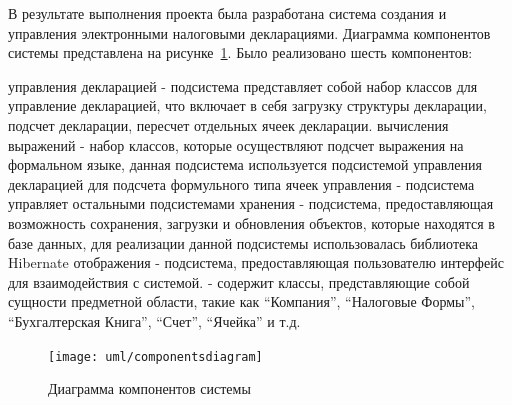 \documentclass[14pt,a4paper]{reportmod}
\begin{document}
В результате выполнения проекта была разработана система создания и управления электронными налоговыми декларациями. Диаграмма компонентов системы представлена на рисунке~\ref{pic:componentsdiagram}. Было реализовано шесть компонентов:
\begin{itemize}
   управления декларацией - подсистема представляет собой набор классов для управление декларацией, что включает в себя загрузку структуры декларации, подсчет декларации, пересчет отдельных ячеек декларации.
   вычисления выражений - набор классов, которые осуществляют подсчет выражения на формальном языке, данная подсистема используется подсистемой управления декларацией для подсчета формульного типа ячеек
   управления - подсистема управляет остальными подсистемами
   хранения - подсистема, предоставляющая возможность сохранения, загрузки и обновления объектов, которые находятся в базе данных, для реализации данной подсистемы использовалась библиотека Hibernate
   отображения - подсистема, предоставляющая пользователю интерфейс для взаимодействия с системой.
   - содержит классы, представляющие собой сущности предметной области, такие как ``Компания'', ``Налоговые Формы'', ``Бухгалтерская Книга'', ``Счет'', ``Ячейка'' и т.д.
\end{itemize}

\begin{figure}
  \centering
  \texttt{[image: uml/componentsdiagram]}
  \caption{Диаграмма компонентов системы}
  \label{pic:componentsdiagram}
\end{figure}
\end{document}
